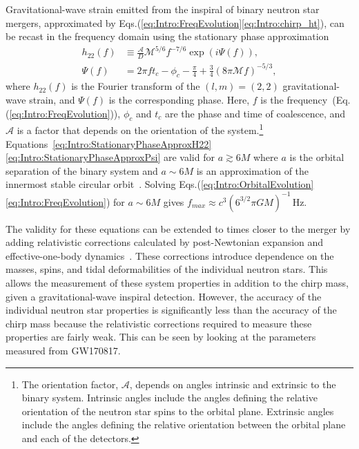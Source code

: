 \documentclass[../Thesis.tex]{subfiles}
\begin{document}
    Gravitational-wave strain emitted from the inspiral of binary neutron star mergers, approximated by Eqs.(\ref{eq:Intro:FreqEvolution}\Hyphdash*\ref{eq:Intro:chirp_ht}), can be recast in the frequency domain using the stationary phase approximation~\cite{Cutler1994}
    \begin{align}
        h_{22}(f) & \equiv \frac{\mathcal{A}}{D}\mathcal{M}^{5/6}f^{-7/6} \exp(i\Psi(f)), \label{eq:Intro:StationaryPhaseApproxH22} \\
        \Psi(f) & = 2\pi f t_c - \phi_c - \frac{\pi}{4} +\frac{3}{4}\left(8\pi\mathcal{M}f\right)^{-5/3}, \label{eq:Intro:StationaryPhaseApproxPsi} 
    \end{align}
    where $h_{22}(f)$ is the Fourier transform of the $(l,m)=(2,2)$ gravitational-wave strain, and $\Psi(f)$ is the corresponding phase.
    Here, $f$ is the frequency~(Eq.(\ref{eq:Intro:FreqEvolution})), $\phi_c$ and $t_c$ are the phase and time of coalescence, and $\mathcal{A}$ is a factor that depends on the orientation of the system.\footnote{The orientation factor, $\mathcal{A}$, depends on angles intrinsic and extrinsic to the binary system. Intrinsic angles include the angles defining the relative orientation of the neutron star spins to the orbital plane. Extrinsic angles include the angles defining the relative orientation between the orbital plane and each of the detectors.}
    Equations~\ref{eq:Intro:StationaryPhaseApproxH22}\Hyphdash*\ref{eq:Intro:StationaryPhaseApproxPsi} are valid for $a \gtrsim 6M$ where $a$ is the orbital separation of the binary system and $a\sim 6M$ is an approximation of the innermost stable circular orbit~\cite{Cutler1994}.
    Solving Eqs.(\ref{eq:Intro:OrbitalEvolution}\Hyphdash*\ref{eq:Intro:FreqEvolution}) for $a \sim 6M$ gives $f_{max}\approx c^3 ( 6^{3/2}\pi G M )^{-1}\,\mathrm{Hz}$.
    \par
    The validity for these equations can be extended to times closer to the merger by adding relativistic corrections calculated by post-Newtonian expansion and effective-one-body dynamics~\cite{Cutler1994,Blanchet1995, Buonanno1999,Droz1999,Damour2012,Yagi2013,Blanchet2014}. %
    These corrections introduce dependence on the masses, spins, and tidal deformabilities of the individual neutron stars.
    This allows the measurement of these system properties in addition to the chirp mass, given a gravitational-wave inspiral detection.
    However, the accuracy of the individual neutron star properties is significantly less than the accuracy of the chirp mass because the relativistic corrections required to measure these properties are fairly weak. 
    This can be seen by looking at the parameters measured from GW170817.
\end{document}
